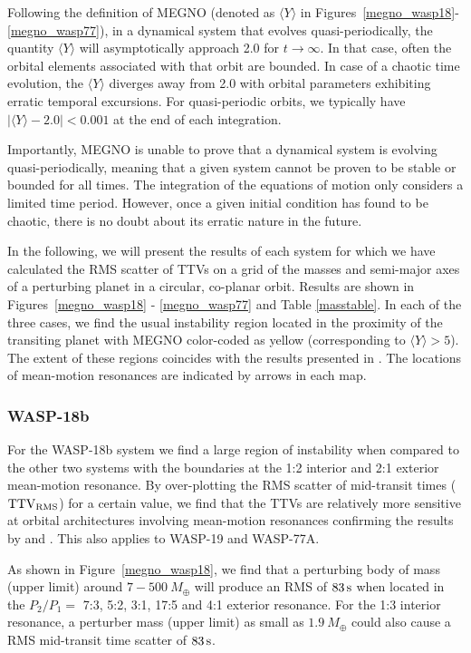 Following the definition of MEGNO \citep{cincsimo2000} (denoted as $\langle Y\rangle$ in Figures~\ref{megno_wasp18}-\ref{megno_wasp77}), in a dynamical system that evolves quasi-periodically, the quantity $\langle Y \rangle$ will asymptotically approach 2.0 for $t \rightarrow \infty$. In that case, often the orbital elements associated with that orbit are bounded. In case of a chaotic time evolution, the $\langle Y\rangle$ diverges away from 2.0 with orbital parameters exhibiting erratic temporal excursions. For quasi-periodic orbits, we typically have $|\langle Y \rangle - 2.0| < 0.001$ at the end of each integration.

Importantly, MEGNO is unable to prove that a dynamical system is evolving quasi-periodically, meaning that a given system cannot be proven to be stable or bounded for all times. The integration of the equations of motion only considers a limited time period. However, once a given initial condition has found to be chaotic, there is no doubt about its erratic nature in the future.

In the following, we will present the results of each system for which we have calculated the RMS scatter of TTVs on a grid of the masses and semi-major axes of a perturbing planet in a circular, co-planar orbit. Results are shown in Figures~\ref{megno_wasp18} - \ref{megno_wasp77} and Table \ref{masstable}. In each of the three cases, we find the usual instability region located in the proximity of the transiting planet with MEGNO color-coded as yellow (corresponding to $\langle Y\rangle > 5$). The extent of these regions coincides with the results presented in \citet{barnes2006}. The locations of mean-motion resonances are indicated by arrows in each map.


\subsubsection{WASP-18b}
For the WASP-18b system we find a large region of instability when compared to the other two systems with the boundaries at the 1:2 interior and 2:1 exterior mean-motion resonance. By over-plotting the RMS scatter of mid-transit times ($\rm TTV_{\rm RMS}$) for a certain value, we find that the TTVs are relatively more sensitive at orbital architectures involving mean-motion resonances confirming the results by \citet{Agol2005} and \citet{Holman2005}. This also applies to WASP-19 and WASP-77A.

As shown in Figure~\ref{megno_wasp18}, we find that a perturbing body of mass (upper limit) around $7-500~M_{\oplus}$ will produce an RMS of $83\,{\rm s}$ when located in the $P_2/P_1=$ 7:3, 5:2, 3:1, 17:5 and 4:1 exterior resonance. For the 1:3 interior resonance, a perturber mass (upper limit) as small as $1.9~M_{\oplus}$ could also cause a RMS mid-transit time scatter of $83\,{\rm s}$.

